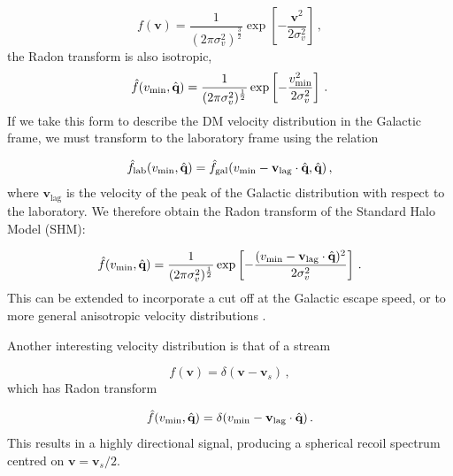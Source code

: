 \begin{equation}
f(\textbf{v}) = \frac{1}{(2\pi \sigma_v^2)^{\frac{3}{2}}} \exp \left[ -\frac{\textbf{v}^2}{2 \sigma_v^2}\right]\,,
\end{equation}
the Radon transform is also isotropic,
\begin{equation}
\hat{f}(\vmin,\hat{\textbf{q}}) = \frac{1}{(2\pi \sigma_v^2)^{\frac{1}{2}}} \exp \left[ -\frac{\vmin^2}{2 \sigma_v^2}\right]\,.
\end{equation}
If we take this form to describe the DM velocity distribution in the Galactic frame, we must transform to the laboratory frame using the relation \cite{Gondolo:2002}

\begin{equation}
\hat{f}_\textrm{lab}(\vmin, \hat{\textbf{q}}) = \hat{f}_\textrm{gal}(\vmin - \textbf{v}_\textrm{lag}\cdot\hat{\textbf{q}} , \hat{\textbf{q}})\,,
\end{equation}
where $\textbf{v}_\textrm{lag}$ is the velocity of the peak of the Galactic distribution with respect to the laboratory. We therefore obtain the Radon transform of the Standard Halo Model (SHM):

\begin{equation}
\label{eq:directional:SHM}
\hat{f}(\vmin,\hat{\textbf{q}}) =  \frac{1}{(2\pi \sigma_v^2)^{\frac{1}{2}}} \exp \left[ -\frac{(\vmin - \textbf{v}_\textrm{lag}\cdot\hat{\textbf{q}})^2}{2 \sigma_v^2}\right]\,.
\end{equation}
This can be extended to incorporate a cut off at the Galactic escape speed, or to more general anisotropic velocity distributions \cite{Gondolo:2002}.

Another interesting velocity distribution is that of a stream

\begin{equation}
f(\textbf{v}) = \delta(\textbf{v} - \textbf{v}_s)\,,
\end{equation}
which has Radon transform

\begin{equation}
\hat{f}(\vmin,\hat{\textbf{q}}) =  \delta(\vmin - \textbf{v}_\textrm{lag}\cdot\hat{\textbf{q}})\,.
\end{equation}
This results in a highly directional signal, producing a spherical recoil spectrum centred on $\textbf{v} = \textbf{v}_s/2$.


